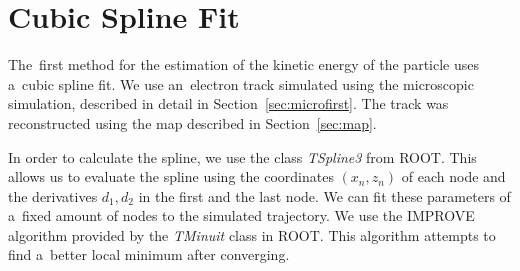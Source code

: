 	\section{Cubic Spline Fit}
	\label{sec:cspline}
		The~first method for the estimation of the kinetic energy of the particle uses a~cubic spline fit. We use an~electron track simulated using the microscopic simulation, described in detail in Section~\ref{sec:microfirst}. The track was reconstructed using the map described in Section~\ref{sec:map}.
				
		In order to calculate the spline, we use the class \textit{TSpline3} from ROOT. This allows us to evaluate the spline using the coordinates $(x_n,z_n)$ of each node and the derivatives $d_1,d_2$ in the first and the last node. We can fit these parameters of a~fixed amount of nodes to the simulated trajectory. We use the IMPROVE algorithm provided by the \textit{TMinuit} class in ROOT. This algorithm attempts to find a~better local minimum after converging.
		
